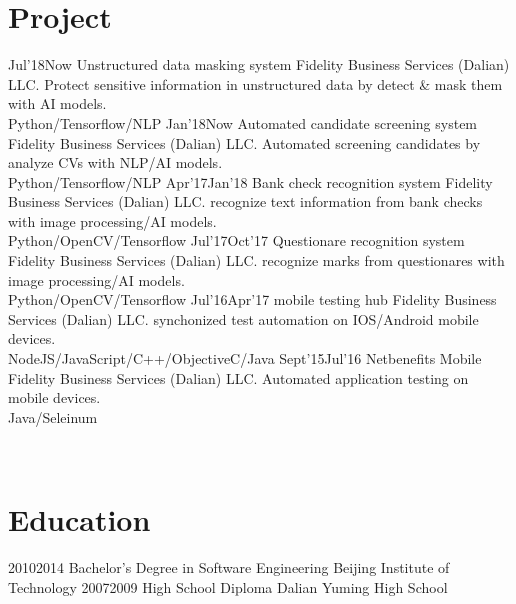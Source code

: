 \documentclass[]{friggeri-cv}
\begin{document}
\section{Project}
\begin{entrylist}
  \entry
    {Jul'18}{Now}
    {Unstructured data masking system}
    {Fidelity Business Services (Dalian) LLC.}
    {Protect sensitive information in unstructured data by detect \& mask them with AI models.\\
     Python/Tensorflow/NLP }
  \entry
    {Jan'18}{Now}
    {Automated candidate screening system}
    {Fidelity Business Services (Dalian) LLC.}
    {Automated screening candidates by analyze CVs with NLP/AI models.\\
     Python/Tensorflow/NLP}
  \entry
    {Apr'17}{Jan'18}
    {Bank check recognition system}
    {Fidelity Business Services (Dalian) LLC.}
    {recognize text information from bank checks with image processing/AI models.\\
     Python/OpenCV/Tensorflow}
  \entry
    {Jul'17}{Oct'17}
    {Questionare recognition system}
    {Fidelity Business Services (Dalian) LLC.}
    {recognize marks from questionares with image processing/AI models.\\
     Python/OpenCV/Tensorflow}
  \entry
    {Jul'16}{Apr'17}
    {mobile testing hub}
    {Fidelity Business Services (Dalian) LLC.}
    {synchonized test automation on IOS/Android mobile devices.\\
     NodeJS/JavaScript/C++/ObjectiveC/Java}
  \entry
    {Sept'15}{Jul'16}
    {Netbenefits Mobile}
    {Fidelity Business Services (Dalian) LLC.}
    {Automated application testing on mobile devices.\\
     Java/Seleinum}
\end{entrylist}
~
\section{Education}
\begin{entrylist}
  \entry
    {2010}{2014}
    {Bachelor's Degree in Software Engineering}
    {Beijing Institute of Technology}
    {}
  \entry
    {2007}{2009}
    {High School Diploma}
    {Dalian Yuming High School}
    {}
\end{entrylist}
\end{document}
